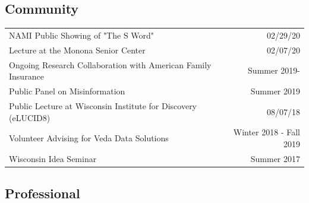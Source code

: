 \documentclass[a4paper,10pt]{article}
\begin{document}
\subsection{Community}

\begin{tabu}{Xr}
NAMI Public Showing of "The S Word" & 02/29/20 \\
Lecture at the Monona Senior Center & 02/07/20 \\
Ongoing Research Collaboration with American Family Insurance & Summer 2019- \\ 
Public Panel on Misinformation & Summer 2019 \\
Public Lecture at Wisconsin Institute for Discovery (eLUCID8) & 08/07/18 \\
Volunteer Advising for Veda Data Solutions & Winter 2018 - Fall 2019 \\
Wisconsin Idea Seminar & Summer 2017 \\
\end{tabu}

\subsection{Professional}
\end{document}
